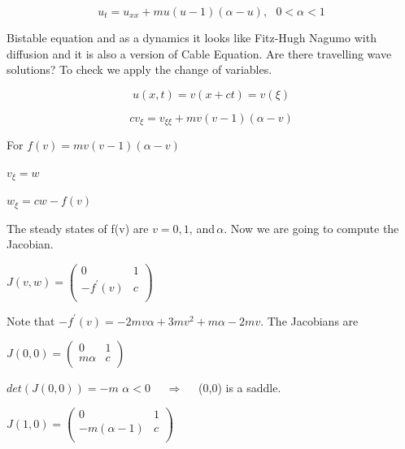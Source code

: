 \documentclass[]{article}
\numberwithin{equation}{section}		%
\begin{document}
\begin{equation}
u_t=u_{xx}+mu(u - 1)(\alpha - u), \ \ \ 0<\alpha<1
\end{equation}

Bistable equation and as a dynamics it looks like Fitz-Hugh Nagumo with diffusion and it is also a version of Cable Equation.
\newline
\noindent Are there travelling wave solutions? To check we apply the
change of variables.

\begin{equation}
u(x,t)=v(x+ct)=v(\xi) \nonumber
\end{equation}

\begin{equation}
cv_\xi =v_{\xi\xi} + m v(v-1)(\alpha-v) \nonumber
\end{equation}

\noindent For $f(v)=m v(v-1)(\alpha-v)$

\begin{center}
$v_{\xi}=w$

$w_{\xi}=cw-f(v)$\\
\end{center}

\noindent The steady states of f(v) are $v=0,1,$\,and\,$\alpha$. Now we are going to compute the Jacobian.


\begin{center}
$J(v,w)=
\begin{pmatrix}
  0 & 1 \\
  -f^{'}(v) & c \\
\end{pmatrix}$
\par\end{center}

Note that $-f^{'}(v)=-2mv\alpha+3mv^{2}+m\alpha-2mv$.
\newline\indent The Jacobians are

\begin{center}
$J(0,0)=
\begin{pmatrix}
  0 & 1 \\
  m\alpha & c \\
\end{pmatrix}$
\par\end{center}

$det(J(0,0))=-m$ $\alpha < 0$ \ \ $ \Rightarrow$ \ \ (0,0) is a saddle.

\begin{center}
$J(1,0)=
\begin{pmatrix}
  0 & 1 \\
  -m(\alpha-1) & c \\
\end{pmatrix}$
\par\end{center}
\end{document}
